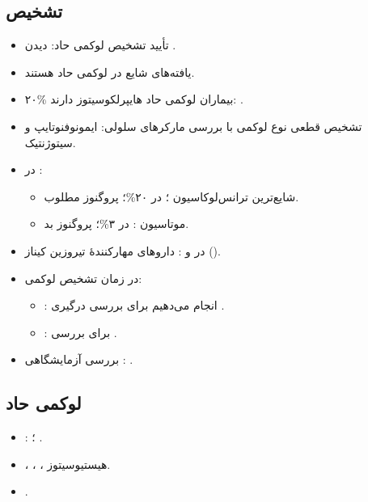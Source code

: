 \documentclass[12pt,a4paper]{article}
\begin{document}
\subsection*{تشخیص}
\begin{itemize}
\item تأیید تشخیص لوکمی حاد: دیدن .
\item {} یافته‌های شایع در لوکمی حاد هستند.
\item ۲۰\% بیماران لوکمی حاد هایپرلکوسیتوز دارند: .
\item تشخیص قطعی نوع لوکمی با بررسی مارکرهای سلولی: ایمونوفنوتایپ و سیتوژنتیک.
\item در :
  \begin{itemize}
  \item شایع‌ترین ترانس‌لوکاسیون ؛ در ۲۰\%؛ پروگنوز مطلوب.
  \item موتاسیون : در ۳\%؛ پروگنوز بد.
  \end{itemize}
\item در  و : داروهای مهارکنندهٔ تیروزین کیناز ().
\item در زمان تشخیص لوکمی:
  \begin{itemize}
  \item {}: انجام می‌دهیم برای بررسی درگیری .
  \item {}: برای بررسی .
  \end{itemize}
\item بررسی آزمایشگاهی : .
\end{itemize}

\subsection*{ لوکمی حاد}
\begin{itemize}
\item {}: ؛ .
\item {}، ، ، هیستیوسیتوز.
\item {}.
\end{itemize}
\end{document}
